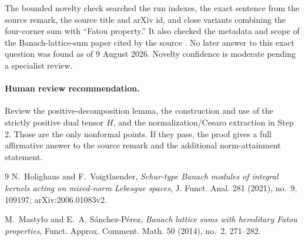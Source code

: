 \documentclass[11pt]{article}
\begin{document}
The bounded novelty check searched the run indexes, the exact sentence from
the source remark, the source title and arXiv id, and close variants combining
the four-corner sum with ``Fatou property.''  It also checked the metadata and
scope of the Banach-lattice-sum paper cited by the source \cite{MSP}.  No later
answer to this exact question was found as of 9 August 2026.  Novelty confidence
is moderate pending a specialist review.

\paragraph{Human review recommendation.}
Review the positive-decomposition lemma, the construction and use of the
strictly positive dual tensor $H$, and the normalization/Cesaro extraction in
Step 2.  Those are the only nonformal points.  If they pass, the proof gives a
full affirmative answer to the source remark and the additional norm-attainment
statement.

\begin{thebibliography}{9}
N.~Holighaus and F.~Voigtlaender,
\emph{Schur-type Banach modules of integral kernels acting on mixed-norm
Lebesgue spaces}, J. Funct. Anal. 281 (2021), no.~9, 109197;
arXiv:2006.01083v2.

M.~Masty\l o and E.~A. S\'anchez-P\'erez,
\emph{Banach lattice sums with hereditary Fatou properties},
Funct. Approx. Comment. Math. 50 (2014), no.~2, 271--282.
\end{thebibliography}
\end{document}
